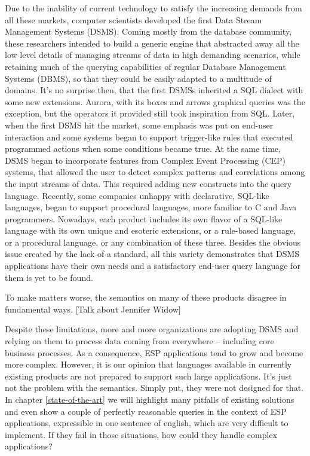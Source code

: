 \documentclass{report}
\begin{document}
Due to the inability of current technology to satisfy the increasing demands from all these markets, computer scientists developed the first Data Stream Management Systems (DSMS). Coming mostly from the database community, these researchers intended to build a generic engine that abstracted away all the low level details of managing streams of data in high demanding scenarios, while retaining much of the querying capabilities of regular Database Management Systems (DBMS), so that they could be easily adapted to a multitude of domains. It's no surprise then, that the first DSMSs inherited a SQL dialect with some new extensions. Aurora, with its boxes and arrows graphical queries was the exception, but the operators it provided still took inspiration from SQL. Later, when the first DSMS hit the market, some emphasis was put on end-user interaction and some systems began to support trigger-like rules that executed programmed actions when some conditions became true. At the same time, DSMS began to incorporate features from Complex Event Processing (CEP) systems, that allowed the user to detect complex patterns and correlations among the input streams of data. This required adding new constructs into the query language. Recently, some companies unhappy with declarative, SQL-like languages, began to support procedural languages, more familiar to C and Java programmers. Nowadays, each product includes its own flavor of a SQL-like language with its own unique and esoteric extensions, or a rule-based language, or a procedural language, or any combination of these three. Besides the obvious issue created by the lack of a standard, all this variety demonstrates that DSMS applications have their own needs and a satisfactory end-user query language for them is yet to be found.

To make matters worse, the semantics on many of these products disagree in fundamental ways. [Talk about Jennifer Widow]

Despite these limitations, more and more organizations are adopting DSMS and relying on them to process data coming from everywhere -- including core business processes. As a consequence, ESP applications tend to grow and become more complex. However, it is our opinion that languages available in currently existing products are not prepared to support such large applications. It's just not the problem with the semantics. Simply put, they were not designed for that. In chapter \ref{state-of-the-art} we will highlight many pitfalls of existing solutions and even show a couple of perfectly reasonable queries in the context of ESP applications, expressible in one sentence of english, which are very difficult to implement. If they fail in those situations, how could they handle complex applications?
\end{document}
